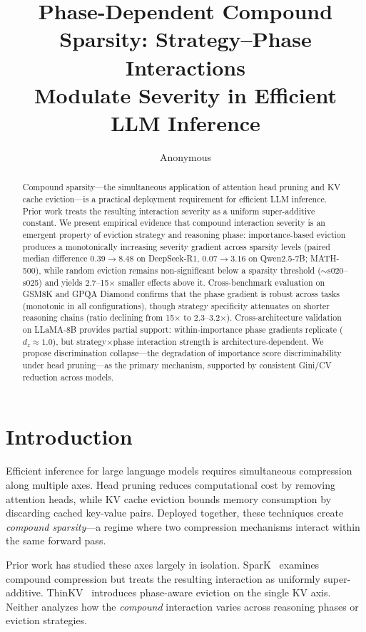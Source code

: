 \documentclass[11pt,a4paper]{article}
\title{Phase-Dependent Compound Sparsity: Strategy--Phase Interactions\\Modulate Severity in Efficient LLM Inference}
\author{Anonymous}
\date{}
\begin{document}
\maketitle

\begin{abstract}
Compound sparsity---the simultaneous application of attention head pruning and KV cache eviction---is a practical deployment requirement for efficient LLM inference. Prior work treats the resulting interaction severity as a uniform super-additive constant. We present empirical evidence that compound interaction severity is an emergent property of eviction strategy and reasoning phase: importance-based eviction produces a monotonically increasing severity gradient across sparsity levels (paired median difference 0.39$\to$8.48 on DeepSeek-R1, 0.07$\to$3.16 on Qwen2.5-7B; MATH-500), while random eviction remains non-significant below a sparsity threshold ($\sim$s020--s025) and yields 2.7--15$\times$ smaller effects above it. Cross-benchmark evaluation on GSM8K and GPQA Diamond confirms that the phase gradient is robust across tasks (monotonic in all configurations), though strategy specificity attenuates on shorter reasoning chains (ratio declining from 15$\times$ to 2.3--3.2$\times$). Cross-architecture validation on LLaMA-8B provides partial support: within-importance phase gradients replicate ($d_z\approx1.0$), but strategy$\times$phase interaction strength is architecture-dependent. We propose discrimination collapse---the degradation of importance score discriminability under head pruning---as the primary mechanism, supported by consistent Gini/CV reduction across models.
\end{abstract}

\section{Introduction}

Efficient inference for large language models requires simultaneous compression along multiple axes. Head pruning reduces computational cost by removing attention heads, while KV cache eviction bounds memory consumption by discarding cached key-value pairs. Deployed together, these techniques create \emph{compound sparsity}---a regime where two compression mechanisms interact within the same forward pass.

Prior work has studied these axes largely in isolation. SparK~\cite{spark2025} examines compound compression but treats the resulting interaction as uniformly super-additive. ThinKV~\cite{thinkv2025} introduces phase-aware eviction on the single KV axis. Neither analyzes how the \emph{compound} interaction varies across reasoning phases or eviction strategies.
\end{document}
